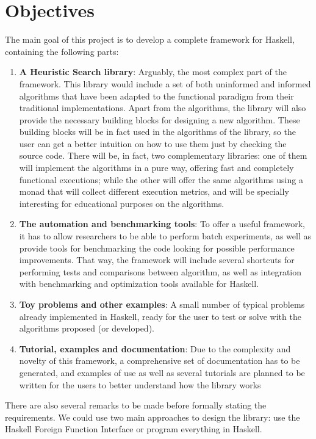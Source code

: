 \section{Objectives}

The main goal of this project is to develop a complete framework for Haskell,
containing the following parts:

\begin{enumerate}
\item \textbf{A Heuristic Search library}: Arguably, the most complex part of
  the framework. This library would include a set of both uninformed and
  informed algorithms that have been adapted to the functional paradigm from
  their traditional implementations. Apart from the algorithms, the library
  will also provide the necessary building blocks for designing a new
  algorithm. These building blocks will be in fact used in the algorithms of
  the library, so the user can get a better intuition on how to use them just
  by checking the source code. There will be, in fact, two complementary
  libraries: one of them will implement the algorithms in a pure way, offering
  fast and completely functional executions; while the other will offer the
  same algorithms using a monad that will collect different execution metrics,
  and will be specially interesting for educational purposes on the algorithms.
\item \textbf{The automation and benchmarking tools}: To offer a useful
  framework, it has to allow researchers to be able to perform batch
  experiments, as well as provide tools for benchmarking the code looking for
  possible performance improvements. That way, the framework will include
  several shortcuts for performing tests and comparisons between algorithm, as
  well as integration with benchmarking and optimization tools available for
  Haskell.
\item \textbf{Toy problems and other examples}: A small number of typical
  problems already implemented in Haskell, ready for the user to test or solve
  with the algorithms proposed (or developed).
\item \textbf{Tutorial, examples and documentation}: Due to the complexity and
  novelty of this framework, a comprehensive set of documentation has to be
  generated, and examples of use as well as several tutorials are planned to be
  written for the users to better understand how the library works
\end{enumerate}

There are also several remarks to be made before formally stating the
requirements. We could use two main approaches to design the library: use the
Haskell Foreign Function Interface or program everything in Haskell.\\

